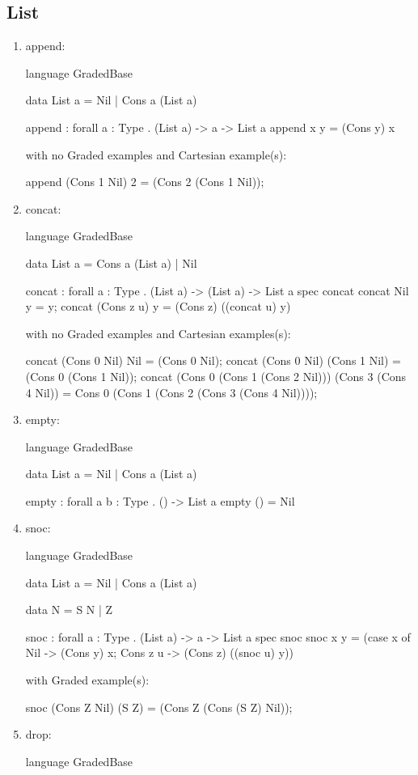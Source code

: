 \subsection{List}
\begin{enumerate}
\item append: 
\begin{granule}
language GradedBase

data List a = Nil | Cons a (List a)
    
append : forall { a : Type }
       . (List a) %
       -> a %
       -> List a
append x y = (Cons y) x
\end{granule}
with no Graded examples and Cartesian example(s):
\begin{granule}
append (Cons 1 Nil) 2 = (Cons 2 (Cons 1 Nil));
\end{granule}
\item concat:
\begin{granule}
language GradedBase 

data List a = Cons a (List a) | Nil
    
concat : forall { a : Type }
       . (List a) %
       -> (List a) %
       ->  List a
spec 
    concat %
concat Nil y = y;
concat (Cons z u) y = (Cons z) ((concat u) y)
\end{granule}
with no Graded examples and Cartesian examples(s):
\begin{granule}
concat (Cons 0 Nil) Nil = (Cons 0 Nil);                                                                        
concat (Cons 0 Nil) (Cons 1 Nil) = (Cons 0 (Cons 1 Nil));                                                       
concat (Cons 0 (Cons 1 (Cons 2 Nil))) (Cons 3 (Cons 4 Nil)) = Cons 0 (Cons 1 (Cons 2 (Cons 3 (Cons 4 Nil))));
\end{granule}
\item empty: 
\begin{granule}
language GradedBase

data List a = Nil | Cons a (List a) 

empty : forall { a b : Type } . () -> List a
empty () = Nil
\end{granule}
\item snoc: 
\begin{granule}
language GradedBase

data List a = Nil | Cons a (List a)

data N = S N | Z

snoc : forall { a : Type }
     . (List a) %
     -> a %
     -> List a
spec 
    snoc %
snoc x y = 
    (case x of
      Nil -> (Cons y) x;
      Cons z u -> (Cons z) ((snoc u) y))
\end{granule}
with Graded example(s):
\begin{granule}
snoc (Cons Z Nil) (S Z) = (Cons Z (Cons (S Z) Nil));
\end{granule}
\item drop: 
\begin{granule}
language GradedBase


\end{granule}
\end{enumerate}
